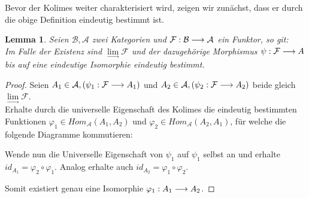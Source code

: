 \documentclass[10pt,a4paper]{report}
\newcommand{\comment}[1]{}
\newcounter{Aussage}[chapter]
\newtheorem{lemma}[Aussage]{Lemma}
\newcommand{\functionfront}[3]{\nolinebreak{#1:#2 \longrightarrow #3}}
\newcommand{\colimes}[0]{\lim\limits_{ \longrightarrow }}
\begin{document}
Bevor der Kolimes weiter charakterisiert wird, zeigen wir zunächst, dass er durch die obige Definition eindeutig bestimmt ist.
\begin{lemma}
Seien $\mathcal{B},\mathcal{A}$ zwei Kategorien und $\functionfront{\mathcal{F}}{\mathcal{B}}{\mathcal{A}}$ ein Funktor, so git:\\ 
Im Falle der Existenz sind $\colimes \mathcal{F}$ und der dazugehörige Morphismus $\functionfront{\psi}{\mathcal{F}}{A}$ bis auf eine eindeutige Isomorphie eindeutig bestimmt.
\end{lemma}
\begin{proof}
Seien $A_1 \in \mathcal{A}, (\functionfront{\psi_1}{\mathcal{F}}{A_1}) $ und $A_2 \in \mathcal{A} , (\functionfront{\psi_2}{\mathcal{F}}{A_2}) $ beide gleich $\colimes \mathcal{F}$.\\
Erhalte durch die universelle Eigenschaft des Kolimes die eindeutig bestimmten Funktionen $\varphi_1 \in Hom_{\mathcal{A}}(A_1,A_2)$ und $\varphi_2 \in Hom_{\mathcal{A}}(A_2,A_1)$, für welche die folgende Diagramme kommutieren:

\comment{$\functionfront{\varphi_1}{\mathcal{A}_1}{\mathcal{A}_2}$ und $\functionfront{\varphi_2}{\mathcal{A}_2}{\mathcal{A}_1}$}
\begin{center}
\end{center}
\begin{flushleft}
Wende nun die Universelle Eigenschaft von $\psi_1$ auf $\psi_1$ selbst an und erhalte $id_{A_1} = \varphi_2 \circ \varphi_1$. Analog erhalte auch $id_{A_2} = \varphi_1 \circ \varphi_2$.
\end{flushleft}
\begin{center}
\end{center}
Somit existiert genau eine Isomorphie $\functionfront{\varphi_1}{A_1}{A_2}$.
\end{proof}
\end{document}
